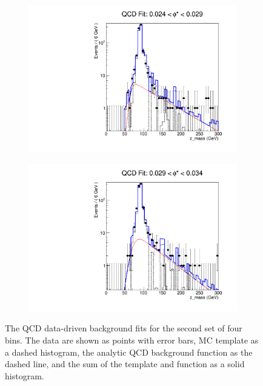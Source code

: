 \begin{figure}[!htbp]
\begin{subfigure}[b]{0.5\textwidth}
        \includegraphics[width=\linewidth]{figures/qcd_fits/qcd_fit_plot_for_07.pdf}
        \caption{}
        \label{fig:qcd_fit_07}
    \end{subfigure}%
    \begin{subfigure}[b]{0.5\textwidth}
        \includegraphics[width=\linewidth]{figures/qcd_fits/qcd_fit_plot_for_08.pdf}
        \caption{}
        \label{fig:qcd_fit_08}
    \end{subfigure}
    \caption{
       The QCD data-driven background fits for the second set of four \phistar
       bins. The data are shown as points with error bars, MC template as a
       dashed histogram, the analytic QCD background function as the dashed
       line, and the sum of the template and function as a solid histogram.
    }
    \label{fig:qcd_many_2}
\end{figure}


